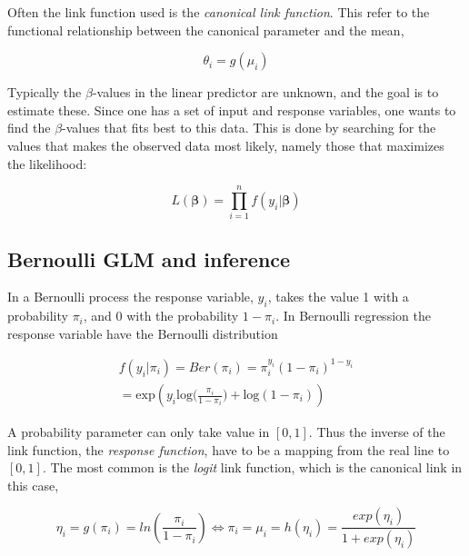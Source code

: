 
Often the link function used is the \textit{canonical link function}. This refer to the functional relationship between the canonical parameter and the mean,

\begin{equation}
\theta_i = g(\mu_i)
\end{equation}



Typically the $\beta$-values in the linear predictor are unknown, and the goal is to estimate these. Since one has a set of input and response variables, one wants to find the $\beta$-values that fits best to this data. This is done by searching for the values that makes the observed data most likely, namely those that maximizes the likelihood:

\begin{equation}
    L(\bm{\beta}) = \prod_{i=1}^{n} f(y_i |\bm{ \beta})
\end{equation}

\subsection{Bernoulli GLM and inference}
\label{sec:Bernoulli}
In a Bernoulli process the response variable, $y_i$, takes the value 1 with a probability $\pi_i$, and 0 with the probability $1-\pi_i$. In Bernoulli regression the response variable have the Bernoulli distribution

\begin{equation}
\begin{split}
    f(y_i|\pi_i) = Ber(\pi_i) = \pi_i^{y_i}(1-\pi_i)^{1-y_i}\\
    = \text{exp} ( y_i  \text{log}\big(\frac{\pi_i}{1-\pi_i}\big) + \text{log}(1-\pi_i))
\end{split}
\end{equation}

A probability parameter can only take value in $[0,1]$. Thus the inverse of the link function, the \textit{response function}, have to be a mapping from the real line to $[0,1]$. The most common is the \textit{logit} link function, which is the canonical link in this case,

\begin{equation}
    \eta_i = g(\pi_i) = ln(\frac{\pi_i}{1-\pi_i}) \Leftrightarrow 
    \pi_i = \mu_i = h(\eta_i) = \frac{exp(\eta_i)}{1+exp(\eta_i)}
\end{equation}

